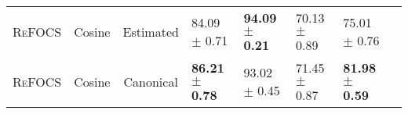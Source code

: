 \begin{table*}[ht]
{\begin{tabular}{lcclllll}
\textsc{ReFOCS}        
& Cosine      &  Estimated
& 84.09 $\pm$ 0.71	
& \textbf{94.09 $\pm$ 0.21}     
& 70.13 $\pm$ 0.89	     
& 75.01 $\pm$ 0.76  \\ 
\textsc{ReFOCS}        
& Cosine      &  Canonical
& \textbf{86.21 $\pm$ 0.78}  
& 93.02 $\pm$ 0.45    
& 71.45 $\pm$ 0.87      
& \textbf{81.98 $\pm$ 0.59}   \\ 
\bottomrule
\end{tabular}
}

\label{tab:traffic}
\end{table*}